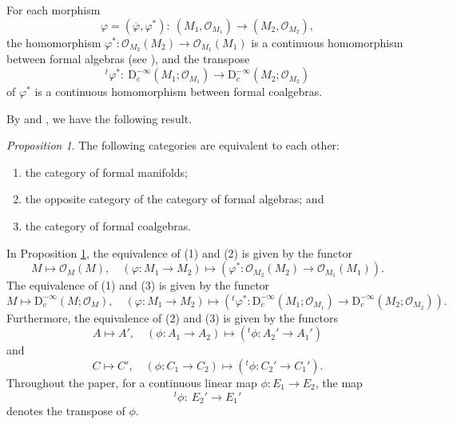 \documentclass[12pt, a4paper]{amsart}
\newcommand{\BC}{{\mathbb {C}}}
\newcommand{\CO}{{\mathcal {O}}}
\newcommand{\RD}{{\mathrm {D}}}
\newcommand{\wh}{\widehat}
\newcommand{\be}{\begin {equation}}
\newcommand{\ee}{\end {equation}}
\newcommand{\qaq}{\quad\textrm{and}\quad}
\theoremstyle{Theorem}
\theoremstyle{Theorem}
\theoremstyle{Theorem}
\theoremstyle{Theorem}
\theoremstyle{Plain}
\theoremstyle{remark}
\theoremstyle{remark}
\theoremstyle{Definition}
\newtheorem{prpd}[dfn]{Proposition}
\numberwithin{equation}{section}
\begin{document}
For each morphism \[\varphi=(\overline\varphi, \varphi^*):\ (M_1,\CO_{M_1})\rightarrow (M_2,\CO_{M_2}),\]the homomorphism $\varphi^*: \CO_{M_2}(M_2)\rightarrow \CO_{M_1}(M_1)$ is a continuous homomorphism between formal algebras (see \cite[Theorem 1.8]{CSW1}), and the transpose \be \label{eq:tvarphi*}{}^t\varphi^*: \ \RD_c^{-\infty}(M_1;\CO_{M_1})\rightarrow \RD_c^{-\infty}(M_2;\CO_{M_2})\ee of $\varphi^*$ is a continuous homomorphism between formal coalgebras.


By \cite[Theorem 5.11]{CSW1} and \cite[the proof of Proposition 9.2]{CSW4}, we have the following result.
\begin{prpd}\label{prop:equiMO} The following categories are equivalent to each other:
\begin{enumerate}
	\item the category of formal manifolds;
	\item the opposite category of the category of formal algebras; and 
	\item the category of formal coalgebras.
\end{enumerate}
\end{prpd}
 
In Proposition \ref{prop:equiMO}, the equivalence of (1) and (2) is given by the functor
\[M\mapsto \CO_M(M),\quad (\varphi:M_1\rightarrow M_2)\mapsto (\varphi^*: \CO_{M_2}(M_2)\rightarrow \CO_{M_1}(M_1)).\] 
The equivalence of (1) and (3) is given by the functor \[M\mapsto \RD^{-\infty}_c(M;\CO_M),\quad (\varphi: M_1\rightarrow M_2)\mapsto ({}^t\varphi^*:\RD^{-\infty}_c(M_1;\CO_{M_1})\rightarrow \RD^{-\infty}_c(M_2;\CO_{M_2})).\] 
Furthermore, 
the equivalence of (2) and (3) is given by the functors \[A\mapsto A', \quad (\phi: A_1\rightarrow A_2)\mapsto({}^t\phi: A_2'\rightarrow A_1') \]  and \[ C\mapsto C', \quad (\phi: C_1\rightarrow C_2)\mapsto({}^t\phi: C_2'\rightarrow C_1'). \] 
Throughout the paper, for a continuous linear map $\phi: E_1\rightarrow E_2$, the map 
\[{}^t\phi:\ E_2'\rightarrow E_1'\]
denotes the transpose of $\phi$.


\end{document}
